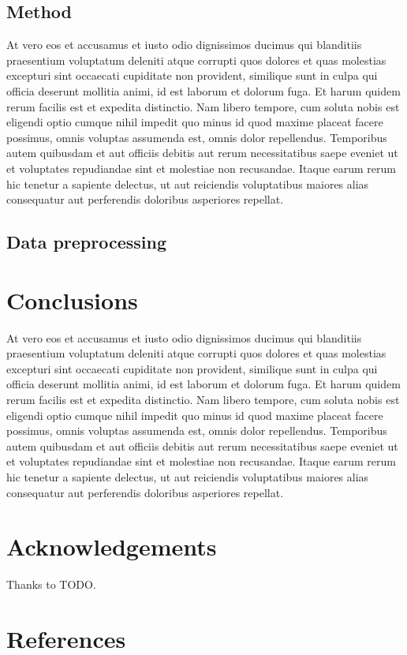 \documentclass[]{IEEEphot}
\begin{document}
\subsection{Method}
At vero eos et accusamus et iusto odio dignissimos ducimus qui blanditiis praesentium voluptatum deleniti atque corrupti quos dolores et quas molestias excepturi sint occaecati cupiditate non provident, similique sunt in culpa qui officia deserunt mollitia animi, id est laborum et dolorum fuga. Et harum quidem rerum facilis est et expedita distinctio. Nam libero tempore, cum soluta nobis est eligendi optio cumque nihil impedit quo minus id quod maxime placeat facere possimus, omnis voluptas assumenda est, omnis dolor repellendus. Temporibus autem quibusdam et aut officiis debitis aut rerum necessitatibus saepe eveniet ut et voluptates repudiandae sint et molestiae non recusandae. Itaque earum rerum hic tenetur a sapiente delectus, ut aut reiciendis voluptatibus maiores alias consequatur aut perferendis doloribus asperiores repellat.

\subsection{Data preprocessing}

\section{Conclusions}

At vero eos et accusamus et iusto odio dignissimos ducimus qui blanditiis praesentium voluptatum deleniti atque corrupti quos dolores et quas molestias excepturi sint occaecati cupiditate non provident, similique sunt in culpa qui officia deserunt mollitia animi, id est laborum et dolorum fuga. Et harum quidem rerum facilis est et expedita distinctio. Nam libero tempore, cum soluta nobis est eligendi optio cumque nihil impedit quo minus id quod maxime placeat facere possimus, omnis voluptas assumenda est, omnis dolor repellendus. Temporibus autem quibusdam et aut officiis debitis aut rerum necessitatibus saepe eveniet ut et voluptates repudiandae sint et molestiae non recusandae. Itaque earum rerum hic tenetur a sapiente delectus, ut aut reiciendis voluptatibus maiores alias consequatur aut perferendis doloribus asperiores repellat.

\section*{Acknowledgements}
Thanks to TODO.


%
%

\section*{References}
\end{document}
